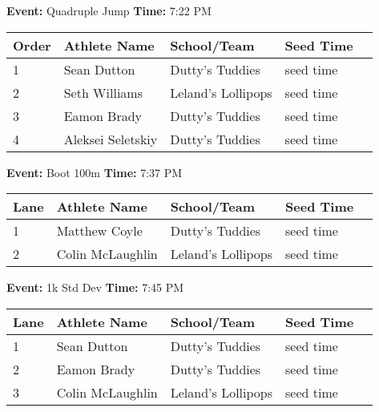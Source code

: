 \documentclass[11pt]{article}
\begin{document}
\textbf{Event:} Quadruple Jump \quad \textbf{Time:} 7:22 PM 

\vspace{1em}
\begin{tabular}{@{}lllll@{}}
\toprule

\textbf{Order} & \textbf{Athlete Name} & \textbf{School/Team} & \textbf{Seed Time} \\
\midrule
1 & Sean Dutton & Dutty's Tuddies & seed time &\\
2 & Seth Williams & Leland's Lollipops & seed time &\\
3 & Eamon Brady & Dutty's Tuddies & seed time &\\
4 & Aleksei Seletskiy & Dutty's Tuddies & seed time &\\
\bottomrule
\end{tabular}
\vspace{2.5em}


\textbf{Event:} Boot 100m \quad \textbf{Time:} 7:37 PM 

\vspace{1em}
\begin{tabular}{@{}lllll@{}}
\toprule

\textbf{Lane} & \textbf{Athlete Name} & \textbf{School/Team} & \textbf{Seed Time} \\
\midrule
1 & Matthew Coyle & Dutty's Tuddies & seed time &\\
2 & Colin McLaughlin & Leland's Lollipops & seed time &\\
\bottomrule
\end{tabular}
\vspace{2.5em}


\textbf{Event:} 1k Std Dev \quad \textbf{Time:} 7:45 PM 

\vspace{1em}
\begin{tabular}{@{}lllll@{}}
\toprule

\textbf{Lane} & \textbf{Athlete Name} & \textbf{School/Team} & \textbf{Seed Time} \\
\midrule
1 & Sean Dutton & Dutty's Tuddies & seed time &\\
2 & Eamon Brady & Dutty's Tuddies & seed time &\\
3 & Colin McLaughlin & Leland's Lollipops & seed time &\\
\bottomrule
\end{tabular}
\vspace{2.5em}
\end{document}
